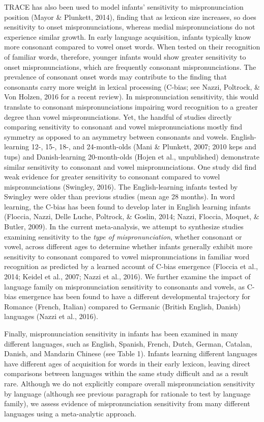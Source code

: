 \documentclass[man]{apa6}
\theoremstyle{definition}
\theoremstyle{definition}
\theoremstyle{definition}
\theoremstyle{remark}
\begin{document}
TRACE has also been used to model infants' sensitivity to
mispronunciation position (Mayor \& Plunkett, 2014), finding that as
lexicon size increases, so does sensitivity to onset mispronunciations,
whereas medial mispronunciations do not experience similar growth. In
early language acquisition, infants typically know more consonant
compared to vowel onset words. When tested on their recognition of
familiar words, therefore, younger infants would show greater
sensitivity to onset mispronunciations, which are frequently consonant
mispronunciations. The prevalence of consonant onset words may
contribute to the finding that consonants carry more weight in lexical
processing (C-bias; see Nazzi, Poltrock, \& Von Holzen, 2016 for a
recent review). In mispronunciation sensitivity, this would translate to
consonant mispronunciations impairing word recognition to a greater
degree than vowel mispronunciations. Yet, the handful of studies
directly comparing sensitivity to consonant and vowel mispronunciations
mostly find symmetry as opposed to an asymmetry between consonants and
vowels. English-learning 12-, 15-, 18-, and 24-month-olds (Mani \&
Plunkett, 2007; 2010 keps and tups) and Danish-learning 20-month-olds
(Hojen et al., unpublished) demonstrate similar sensitivity to consonant
and vowel mispronunciations. One study did find weak evidence for
greater sensitivity to consonant compared to vowel mispronunciations
(Swingley, 2016). The English-learning infants tested by Swingley were
older than previous studies (mean age 28 months). In word learning, the
C-bias has been found to develop later in English learning infants
(Floccia, Nazzi, Delle Luche, Poltrock, \& Goslin, 2014; Nazzi, Floccia,
Moquet, \& Butler, 2009). In the current meta-analysis, we attempt to
synthesize studies examining sensitivity to the \emph{type of
mispronunciation}, whether consonant or vowel, across different ages to
determine whether infants generally exhibit more sensitivity to
consonant compared to vowel mispronunciations in familiar word
recognition as predicted by a learned account of C-bias emergence
(Floccia et al., 2014; Keidel et al., 2007; Nazzi et al., 2016). We
further examine the impact of language family on mispronunciation
sensitivity to consonants and vowels, as C-bias emergence has been found
to have a different developmental trajectory for Romance (French,
Italian) compared to Germanic (British English, Danish) languages (Nazzi
et al., 2016).

Finally, mispronunciation sensitivity in infants has been examined in
many different languages, such as English, Spanish, French, Dutch,
German, Catalan, Danish, and Mandarin Chinese (see Table 1). Infants
learning different languages have different ages of acquisition for
words in their early lexicon, leaving direct comparisons between
languages within the same study difficult and as a result rare. Although
we do not explicitly compare overall mispronunciation sensitivity by
language (although see previous paragraph for rationale to test by
language family), we assess evidence of mispronunciation sensitivity
from many different languages using a meta-analytic approach.
\end{document}

